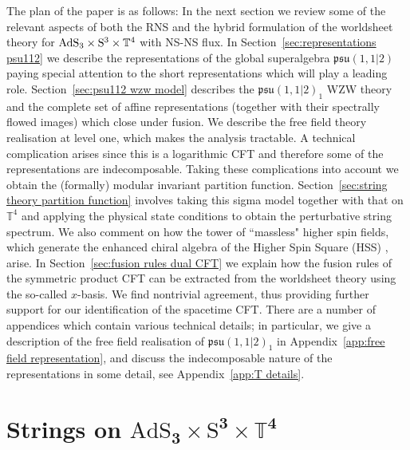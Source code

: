 \documentclass[12pt,a4paper]{article}
\begin{document}
The plan of the paper is as follows:  In the next section we review some of the relevant aspects of both the RNS and the hybrid formulation of the worldsheet theory for ${\rm AdS}_3\times {\rm S}^3\times \mathbb{T}^4$ with NS-NS flux. In Section~\ref{sec:representations psu112} we describe the representations of the global superalgebra $\mathfrak{psu}(1,1|2)$ paying special attention to the short representations which will play a leading role. Section~\ref{sec:psu112 wzw model} describes the $\mathfrak{psu}(1,1|2)_1$ WZW theory and the complete set of affine representations (together with their spectrally flowed images) which close under fusion. We describe the free field theory realisation at level one, which makes the analysis tractable. A technical complication arises since this is a logarithmic CFT and therefore some of the representations are indecomposable. Taking these complications into account we obtain the (formally) modular invariant partition function. Section~\ref{sec:string theory partition function} involves taking this sigma model together with that on $\mathbb{T}^4$ and applying the physical state conditions to obtain the perturbative string spectrum. We also comment on how the tower of ``massless" higher spin fields, which generate the enhanced chiral algebra of the Higher Spin Square (HSS) \cite{Gaberdiel:2015mra}, arise. In Section~\ref{sec:fusion rules dual CFT} we explain how the fusion rules of the symmetric product CFT can be extracted from the worldsheet theory using the so-called $x$-basis. 
We find nontrivial agreement, thus providing further support for our identification of the spacetime CFT. There are a number of appendices which contain various technical details; in particular, we give a description of the free field realisation of $\mathfrak{psu}(1,1|2)_1$ in Appendix~\ref{app:free field representation}, and discuss the indecomposable nature of the representations in some detail, see Appendix~\ref{app:T details}. 


\section{Strings on $\boldsymbol{\mathrm{AdS}_3 \times \mathrm{S}^3 \times \mathbb{T}^4}$} \label{sec:strings on AdS3S3T4}
\end{document}
